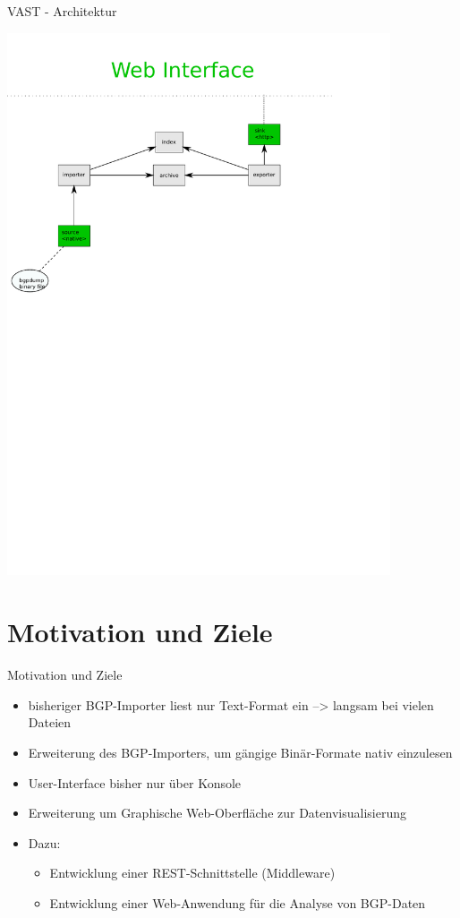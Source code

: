 \documentclass[9pt]{beamer}
\begin{document}
\begin{frame}{VAST - Architektur}{}
	\begin{center}
		\includegraphics[width=0.85\textwidth]{res/swp_vast.pdf}
	\end{center}
\end{frame}


\section{Motivation und Ziele}

\begin{frame}{Motivation und Ziele}{}
	\begin{itemize}
		\item bisheriger BGP-Importer liest nur Text-Format ein --> langsam bei vielen Dateien
		\item Erweiterung des BGP-Importers, um gängige Binär-Formate nativ einzulesen
		\item User-Interface bisher nur über Konsole
		\item Erweiterung um Graphische Web-Oberfläche zur Datenvisualisierung
		\item Dazu:
		\begin{itemize}
			\item Entwicklung einer REST-Schnittstelle (Middleware)
			\item Entwicklung einer Web-Anwendung für die Analyse von BGP-Daten
		\end{itemize}
	\end{itemize}
\end{frame}
\end{document}

